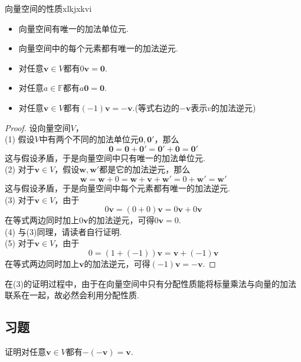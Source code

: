 \documentclass[lang=cn, zihao=5]{elegantbook}
\newcommand{\F}{\mathbb{F}}
\begin{document}
\begin{proposition}{向量空间的性质}{xlkjxkvi}
	\begin{itemize}
		\item 向量空间有唯一的加法单位元.
		\item 向量空间中的每个元素都有唯一的加法逆元.
		\item 对任意$\boldsymbol{v} \in V$都有$0\boldsymbol{v}=\boldsymbol{0}$.
		\item 对任意$a \in \F$都有$a\boldsymbol{0}=\boldsymbol{0}$.
		\item 对任意$\boldsymbol{v} \in V$都有$(-1)\boldsymbol{v}=\boldsymbol{-v}$.(等式右边的$\boldsymbol{-v}$表示$v$的加法逆元)
	\end{itemize}
\end{proposition}
\begin{proof}
	设向量空间$V$， \\
	(1) 假设$V$中有两个不同的加法单位元$\boldsymbol{0},\boldsymbol{0'}$，那么$$\boldsymbol{0} = \boldsymbol{0} + \boldsymbol{0'} = \boldsymbol{0'} + \boldsymbol{0} = \boldsymbol{0'}$$
	这与假设矛盾，于是向量空间中只有唯一的加法单位元. \\
	(2) 对于$\boldsymbol{v} \in V$，假设$\boldsymbol{w},\boldsymbol{w'}$都是它的加法逆元，那么$$\boldsymbol{w} = \boldsymbol{w}+0 = \boldsymbol{w} + \boldsymbol{v} + \boldsymbol{w'} = 0 + \boldsymbol{w'} = \boldsymbol{w'}$$
	这与假设矛盾，于是向量空间中每个元素都有唯一的加法逆元. \\
	(3) 对于$\boldsymbol{v} \in V$，由于$$0\boldsymbol{v} = (0+0)\boldsymbol{v} = 0\boldsymbol{v} + 0\boldsymbol{v}$$
	在等式两边同时加上$0\boldsymbol{v}$的加法逆元，可得$0\boldsymbol{v} = 0$. \\
	(4) 与(3)同理，请读者自行证明. \\
	(5) 对于$\boldsymbol{v} \in V$，由于$$0 = (1+(-1))\boldsymbol{v} = \boldsymbol{v} + (-1)\boldsymbol{v}$$
	在等式两边同时加上$\boldsymbol{v}$的加法逆元，可得$(-1)\boldsymbol{v} = \boldsymbol{-v}$.
\end{proof}
\begin{remark}
	在(3)的证明过程中，由于在向量空间中只有分配性质能将标量乘法与向量的加法联系在一起，故必然会利用分配性质.
\end{remark}

\subsection*{习题}

\begin{exercise}
	证明对任意$\boldsymbol{v} \in V$都有$-(\boldsymbol{-v})=\boldsymbol{v}$.
\end{exercise}
\end{document}
